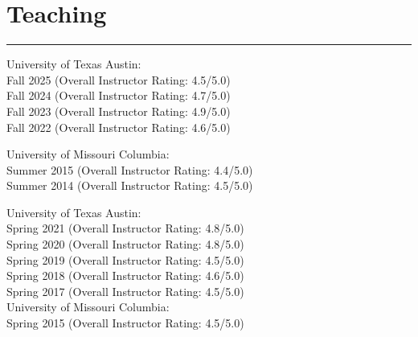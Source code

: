 \documentclass[]{deedy-resume-openfont}
\begin{document}
\section{Teaching}
\vspace*{-.25cm}
\rule{\textwidth}{0.3pt}
\begin{minipage}[t]{0.5\textwidth} 

 \location{}
University of Texas Austin:\\
\hspace*{.4cm} Fall 2025 (Overall Instructor Rating: 4.5/5.0) \\
\hspace*{.4cm} Fall 2024 (Overall Instructor Rating: 4.7/5.0) \\
\hspace*{.4cm} Fall 2023 (Overall Instructor Rating: 4.9/5.0) \\
\hspace*{.4cm} Fall 2022 (Overall Instructor Rating: 4.6/5.0) \\
\sectionsep

 \location{}
University of Missouri Columbia:\\
\hspace*{.4cm} Summer 2015 (Overall Instructor Rating: 4.4/5.0) \\
\hspace*{.4cm} Summer 2014 (Overall Instructor Rating: 4.5/5.0) \\
\sectionsep

\end{minipage} 
\hfill
\begin{minipage}[t]{0.49\textwidth} 

 \location{}
University of Texas Austin:\\
\hspace*{.4cm} Spring 2021 (Overall Instructor Rating: 4.8/5.0) \\
\hspace*{.4cm} Spring 2020 (Overall Instructor Rating: 4.8/5.0) \\
\hspace*{.4cm} Spring 2019 (Overall Instructor Rating: 4.5/5.0) \\
\hspace*{.4cm} Spring 2018 (Overall Instructor Rating: 4.6/5.0) \\
\hspace*{.4cm} Spring 2017 (Overall Instructor Rating: 4.5/5.0) \\
University of Missouri Columbia:\\
\hspace*{.4cm} Spring 2015 (Overall Instructor Rating: 4.5/5.0) \\
\sectionsep


\end{minipage} 
\end{document}
